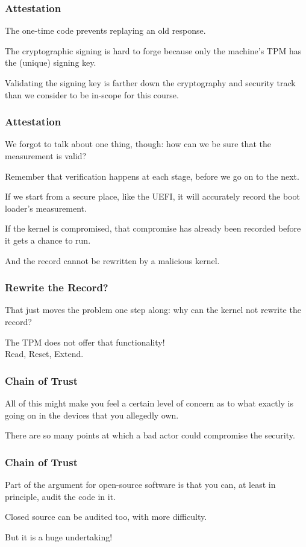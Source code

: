 \begin{frame}
\frametitle{Attestation}

The one-time code prevents replaying an old response.

The cryptographic signing is hard to forge because only the machine's TPM has the (unique) signing key.

Validating the signing key is farther down the cryptography and security track than we consider to be in-scope for this course.

\end{frame}


\begin{frame}
\frametitle{Attestation}

We forgot to talk about one thing, though: how can we be sure that the measurement is valid? 

Remember that verification happens at each stage, before we go on to the next. 

If we start from a secure place, like the UEFI, it will accurately record the boot loader's measurement. 

If the kernel is compromised, that compromise has already been recorded before it gets a chance to run. 

And the record cannot be rewritten by a malicious kernel.

\end{frame}


\begin{frame}
\frametitle{Rewrite the Record?}

That just moves the problem one step along: why can the kernel not rewrite the record? 

The TPM does not offer that functionality!\\
\quad Read, Reset, Extend.


\end{frame}


\begin{frame}
\frametitle{Chain of Trust}

All of this might make you feel a certain level of concern as to what exactly is going on in the devices that you allegedly own.

There are so many points at which a bad actor could compromise the security.

\end{frame}


\begin{frame}
\frametitle{Chain of Trust}

Part of the argument for open-source software is that you can, at least in principle, audit the code in it.

Closed source can be audited too, with more difficulty.

But it is a huge undertaking!


\end{frame}


